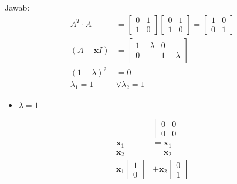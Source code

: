 \documentclass[12pt, a4paper]{scrartcl}
\begin{document}
\begin{enumerate}
\begin{enumerate}
                Jawab:
                \begin{align*}
                    A^T\cdot A&=\begin{bmatrix}
                        0&1\\1&0
                    \end{bmatrix}\begin{bmatrix}
                        0&1\\1&0
                    \end{bmatrix}=\begin{bmatrix}
                        1&0\\0&1
                    \end{bmatrix}
                    \\ (A-\textbf{x}I)&=\begin{bmatrix}
                        1-\lambda&0\\0&1-\lambda
                    \end{bmatrix}
                    \\ (1-\lambda)^2&=0
                    \\ \lambda_1=1&\lor \lambda_2=1
                \end{align*}
                \begin{itemize}
                    \item[] $\lambda = 1$
                \end{itemize}
                \begin{align*}
                    &\begin{bmatrix}
                        0&0\\0&0
                    \end{bmatrix}
                    \\ \textbf{x}_1&=\textbf{x}_1
                    \\ \textbf{x}_2&=\textbf{x}_2
                    \\ \textbf{x}_1\begin{bmatrix}
                        1\\0
                    \end{bmatrix} &+ \textbf{x}_2\begin{bmatrix}
                        0\\1
                    \end{bmatrix}
                \end{align*}
                \begin{itemize}

\end{itemize}
\end{enumerate}
\end{enumerate}
\end{document}
